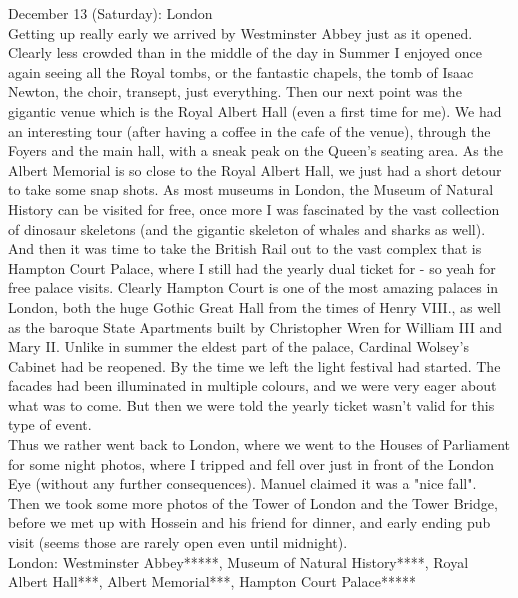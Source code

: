 December 13 (Saturday): London\\
Getting up really early we arrived by Westminster Abbey just as it opened. Clearly less crowded than in the middle of the day in Summer I enjoyed once again seeing all the Royal tombs, or the fantastic chapels, the tomb of Isaac Newton, the choir, transept, just everything. Then our next point was the gigantic venue which is the Royal Albert Hall (even a first time for me). We had an interesting tour (after having a coffee in the cafe of the venue), through the Foyers and the main hall, with a sneak peak on the Queen's seating area. As the Albert Memorial is so close to the Royal Albert Hall, we just had a short detour to take some snap shots. As most museums in London, the Museum of Natural History can be visited for free, once more I was fascinated by the vast collection of dinosaur skeletons (and the gigantic skeleton of whales and sharks as well). \\ 
And then it was time to take the British Rail out to the vast complex that is Hampton Court Palace, where I still had the yearly dual ticket for - so yeah for free palace visits. Clearly Hampton Court is one of the most amazing palaces in London, both the huge Gothic Great Hall from the times of Henry VIII., as well as the baroque State Apartments built by Christopher Wren for William III and Mary II. Unlike in summer the eldest part of the palace, Cardinal Wolsey's Cabinet had be reopened. By the time we left the light festival had started. The facades had been illuminated in multiple colours, and we were very eager about what was to come. But then we were told the yearly ticket wasn't valid for this type of event.\\
Thus we rather went back to London, where we went to the Houses of Parliament for some night photos, where I tripped and fell over just in front of the London Eye (without any further consequences). Manuel claimed it was a "nice fall". Then we took some more photos of the Tower of London and the Tower Bridge, before we met up with Hossein and his friend for dinner, and early ending pub visit (seems those are rarely open even until midnight).\\

London: Westminster Abbey*****, Museum of Natural History****, Royal Albert Hall***, Albert Memorial***, Hampton Court Palace*****\\

